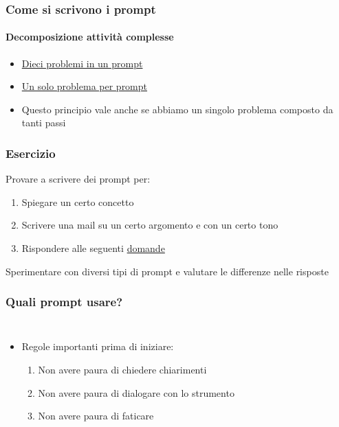 \begin{exampleframe}
    \frametitle{Come si scrivono i prompt}
    \framesubtitle{Decomposizione attività complesse}

    \begin{itemize}
        \item \href{https://chatgpt.com/share/675be9d5-8804-8003-b24a-851e8edf3401}{Dieci problemi in un prompt}
        \item \href{https://chatgpt.com/share/675bef6b-fa34-8003-8932-b1b662061efe}{Un solo problema per prompt}

        \bigskip
        \item Questo principio vale anche se abbiamo un singolo problema composto da tanti passi
    \end{itemize}
\end{exampleframe}

\begin{exerciseframe}
    \frametitle{Esercizio}

    Provare a scrivere dei prompt per:
    \begin{enumerate}
        \item Spiegare un certo concetto
        \item Scrivere una mail su un certo argomento e con un certo tono
        \item Rispondere alle seguenti \href{https://raw.githubusercontent.com/DavidePonzini/didattica/refs/heads/main/quesiti_medie.md}{domande}
    \end{enumerate}

    \bigskip
    Sperimentare con diversi tipi di prompt e valutare le differenze nelle risposte
\end{exerciseframe}


\begin{contentframe}
    \frametitle{Quali prompt usare?}

    \begin{columns}
        \begin{itemize}
            \item Regole importanti prima di iniziare:
            \begin{enumerate}
                \item Non avere paura di chiedere chiarimenti 
                \item Non avere paura di dialogare con lo strumento
                \item Non avere paura di faticare
            \end{enumerate}
        \end{itemize}
        
        \centering
    \end{columns}
\end{contentframe}


